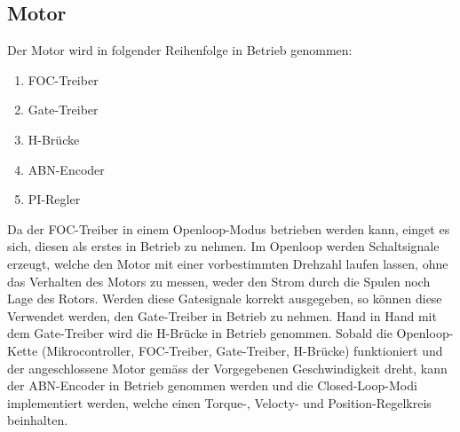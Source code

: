 \newpage
\subsection{Motor}
\label{subsec:Inbetriebnahme_Motor}

Der Motor wird in folgender Reihenfolge in Betrieb genommen:

\begin{enumerate}
\item FOC-Treiber
\item Gate-Treiber
\item H-Brücke
\item ABN-Encoder
\item PI-Regler
\end{enumerate}

Da der FOC-Treiber in einem Openloop-Modus betrieben werden kann, einget es sich, diesen als erstes in Betrieb zu nehmen. Im Openloop werden Schaltsignale erzeugt, welche den Motor mit einer vorbestimmten Drehzahl laufen lassen, ohne das Verhalten des Motors zu messen, weder den Strom durch die Spulen noch Lage des Rotors. Werden diese Gatesignale korrekt ausgegeben, so können diese Verwendet werden, den Gate-Treiber in Betrieb zu nehmen. Hand in Hand mit dem Gate-Treiber wird die H-Brücke in Betrieb genommen. Sobald die Openloop-Kette (Mikrocontroller, FOC-Treiber, Gate-Treiber, H-Brücke) funktioniert und der angeschlossene Motor gemäss der Vorgegebenen Geschwindigkeit dreht, kann der ABN-Encoder in Betrieb genommen werden und die Closed-Loop-Modi implementiert werden, welche einen Torque-, Velocty- und Position-Regelkreis beinhalten.
